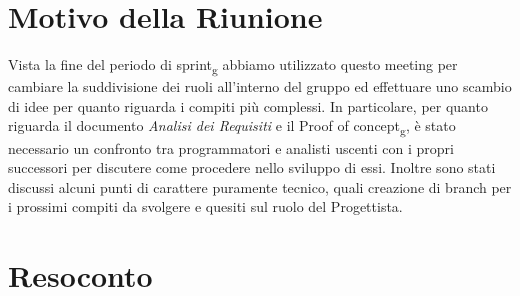 \section{Motivo della Riunione}
Vista la fine del periodo di sprint\textsubscript{g} abbiamo utilizzato questo meeting per cambiare la suddivisione dei ruoli all'interno del gruppo ed effettuare uno scambio di idee per quanto riguarda i compiti più complessi.
\newline In particolare, per quanto riguarda il documento \textit{Analisi dei Requisiti} e il Proof of concept\textsubscript{g}, è stato necessario un confronto tra programmatori e analisti uscenti con i propri successori per discutere come procedere nello sviluppo di essi.
\newline Inoltre sono stati discussi alcuni punti di carattere puramente tecnico, quali creazione di branch per i prossimi compiti da svolgere e quesiti sul ruolo del Progettista.
\section{Resoconto}
